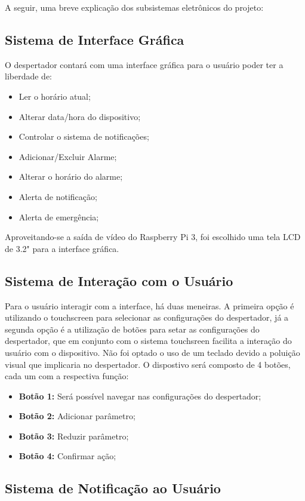 \documentclass[conference]{IEEEtran}
\begin{document}
A seguir, uma breve explicação dos subsistemas eletrônicos do projeto:
\\

\subsection{\textbf{Sistema de Interface Gráfica}}
O despertador contará com uma interface gráfica para o usuário poder ter a liberdade de:
\begin{itemize}
	\item Ler o horário atual;
	\item Alterar data/hora do dispositivo;
    \item Controlar o sistema de notificações;
    \item Adicionar/Excluir Alarme;
    \item Alterar o horário do alarme;
    \item Alerta de notificação;
    \item Alerta de emergência;
    
\end{itemize}
Aproveitando-se a saída de vídeo do Raspberry Pi 3, foi escolhido uma tela LCD de 3.2" para a interface gráfica.

\subsection{\textbf{Sistema de Interação com o Usuário}}
Para o usuário interagir com a interface, há duas meneiras. A primeira opção é utilizando o touchscreen para selecionar as configurações do despertador, já a segunda opção é a utilização de botões para setar as configurações do despertador, que em conjunto com o sistema touchsreen facilita a interação do usuário com o dispositivo. Não foi optado o uso de um teclado devido a poluição visual que implicaria no despertador. O dispostivo será composto de 4 botões, cada um com a respectiva função: 

\begin{itemize}
	\item \textbf{Botão 1:} Será possível navegar nas configurações do despertador;
    \item \textbf{Botão 2:} Adicionar parâmetro;
    \item \textbf{Botão 3:} Reduzir parâmetro;
    \item \textbf{Botão 4:} Confirmar ação;
\end{itemize}

\subsection{\textbf{Sistema de Notificação ao Usuário}}
\end{document}
